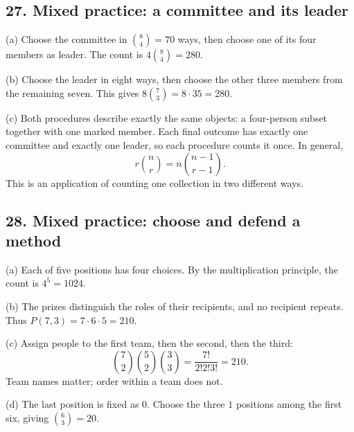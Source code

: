 \documentclass[11pt,letterpaper]{article}
\newcommand{\answer}[2]{\Needspace{2in}\subsection*{#1}#2}
\begin{document}
\answer{27. Mixed practice: a committee and its leader}{(a) Choose the committee in $\binom84=70$ ways, then choose one of its four members as leader. The count is $4\binom84=\boxed{280}$.

(b) Choose the leader in eight ways, then choose the other three members from the remaining seven. This gives $8\binom73=8\cdot35=\boxed{280}$.

(c) Both procedures describe exactly the same objects: a four-person subset together with one marked member. Each final outcome has exactly one committee and exactly one leader, so each procedure counts it once. In general,
\[
\boxed{r\binom nr=n\binom{n-1}{r-1}}.
\]
This is an application of counting one collection in two different ways.}

\answer{28. Mixed practice: choose and defend a method}{(a) Each of five positions has four choices. By the multiplication principle, the count is $4^5=\boxed{1024}$.

(b) The prizes distinguish the roles of their recipients, and no recipient repeats. Thus $P(7,3)=7\cdot6\cdot5=\boxed{210}$.

(c) Assign people to the first team, then the second, then the third:
\[
\binom72\binom52\binom33=\frac{7!}{2!2!3!}=\boxed{210}.
\]
Team names matter; order within a team does not.

(d) The last position is fixed as $0$. Choose the three $1$ positions among the first six, giving $\binom63=\boxed{20}$.}
\end{document}
